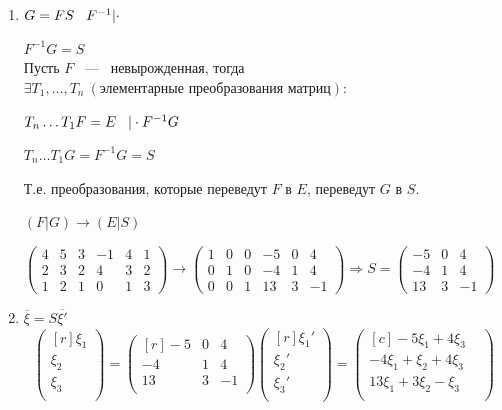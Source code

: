 \begin{enumerate}
	\item 
	
	$G=FS \hspace{3mm} F^{-1}|\cdot$
	
	$F^{-1}G = S$\\
	Пусть $F$ ~---~ невырожденная, тогда $\exists T_1,\dots,T_n\ (\text{элементарные преобразования матриц})$:
	
	$T_n\dots T_1F=E \hspace{3mm} |\cdot F^{-1}G$
	
	$T_n\dots T_1G=F^{-1}G=S$
	\vspace{2mm}
	
	Т.е. преобразования, которые переведут $F$ в $E$, переведут $G$ в $S$.
	
	$(F|G) \rightarrow (E|S)$
	
	$\left( \begin{array}{rrr|rrr}
	4 & 5 & 3 & -1 &4 & 1  \\
	2 & 3& 2&4&3&2\\
	1&2&1&0&1&3
	\end{array}\right)\rightarrow \left( \begin{array}{rrr|rrr}
	1  & 0 & 0 & -5 &0 & 4  \\
	0 & 1& 0&-4&1&4\\
	0&0&1&13&3&-1
	\end{array}\right)
	\Rightarrow S=\left( \begin{array}{rrr}
	-5 &0 & 4  \\
	-4&1&4\\
	13&3&-1
	\end{array}\right)
	$
	\item $\overline{\xi}=S\overline{\xi'}$
	$$\begin{pmatrix*}[r]
	\xi_1\\  
	\xi_2\\
	\xi_3\\
	\end{pmatrix*} = 
	\begin{pmatrix*}[r]
	-5 & 0 & 4\\
	-4 & 1 & 4\\
	13 & 3 & -1\\
	\end{pmatrix*}\begin{pmatrix*}[r]
	\xi_1'\\  
	\xi_2'\\
	\xi_3'\\
	\end{pmatrix*} =\begin{pmatrix*}[c]
	-5\xi_1+4\xi_3 & \\  
	-4\xi_1+\xi_2+4\xi_3 & \\
	13\xi_1 +3\xi_2 -\xi_3 & \\
	\end{pmatrix*}
	$$
	
\end{enumerate}
